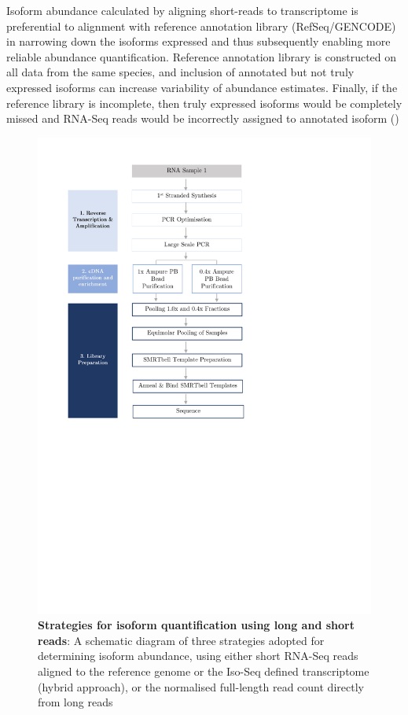 Isoform abundance calculated by aligning short-reads to transcriptome is preferential to alignment with reference annotation library (RefSeq/GENCODE) in narrowing down the isoforms expressed and thus subsequently enabling more reliable abundance quantification. Reference annotation library is constructed on all data from the same species, and inclusion of annotated but not truly expressed isoforms can increase variability of abundance estimates. Finally, if the reference library is incomplete, then truly expressed isoforms would be completely missed and RNA-Seq reads would be incorrectly assigned to annotated isoform (\cite{Au2013})

\begin{figure}[htp]
	\begin{center}
		\includegraphics[page=8,trim={2cm 19cm 0 1cm},clip, scale = 0.8]{Figures/ProjectDevelopment_Figures.pdf}
	\end{center}
	\captionsetup{width=0.95\textwidth}
	\caption[Strategies for isoform quantification]%
	{\textbf{Strategies for isoform quantification using long and short reads}: A schematic diagram of three strategies adopted for determining isoform abundance, using either short RNA-Seq reads aligned to the reference genome or the Iso-Seq defined transcriptome (hybrid approach), or the normalised full-length read count directly from long reads}
	\label{fig:isoform_quant_strategy}
\end{figure}


